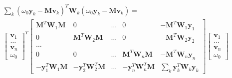 \documentclass{article}
\begin{document}
\begin{align}
\sum_k (\omega_0\mathbf{y}_k - \mathbf{M} \mathbf{v}_k)^T \mathbf{W}_k (\omega_0 \mathbf{y}_k - \mathbf{M} \mathbf{v}_k) = \\
\begin{bmatrix}
    \mathbf{v}_1 \\
    \dots \\
    \mathbf{v}_n \\
    \omega_0
\end{bmatrix}^T
\begin{bmatrix}
    \mathbf{M}^T\mathbf{W}_1 \mathbf{M} & 0 & \dots & 0 & -\mathbf{M}^T\mathbf{W}_1\mathbf{y}_1 \\
    0 & \mathbf{M}^T \mathbf{W}_2 \mathbf{M} & \dots & 0 & -\mathbf{M}^T\mathbf{W}_2\mathbf{y}_2 \\
    \dots \\
    0 & 0 & \dots & \mathbf{M}^T \mathbf{W}_n \mathbf{M} & -\mathbf{M}^T \mathbf{W}_n \mathbf{y}_n \\
    -\mathbf{y}_1^T \mathbf{W}_1 \mathbf{M} & -\mathbf{y}_2^T \mathbf{W}_2^T \mathbf{M} & \dots & -\mathbf{y}_n^T \mathbf{W}_n^T \mathbf{M} & \sum_k \mathbf{y}_k^T \mathbf{W}_k \mathbf{y}_k
\end{bmatrix}
\begin{bmatrix}
    \mathbf{v}_1 \\
    \dots \\
    \mathbf{v}_n \\
    \omega_0
\end{bmatrix}
\end{align}
\end{document}

